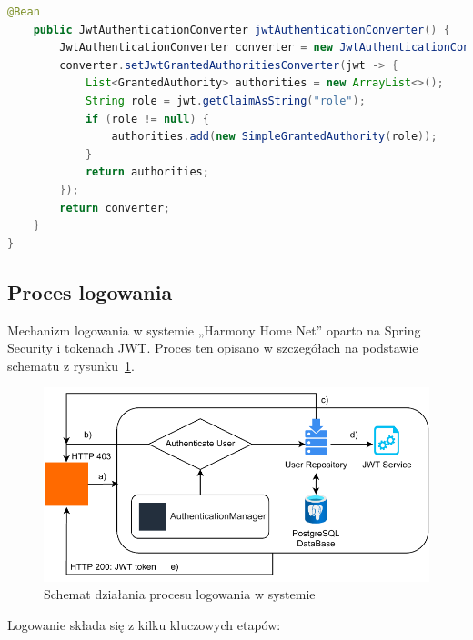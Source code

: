 \begin{lstlisting}[language=Java, style=JavaStyle, caption=Pełna konfiguracja łańcucha filtrów bezpieczeństwa]
    @Bean
    public JwtAuthenticationConverter jwtAuthenticationConverter() {
        JwtAuthenticationConverter converter = new JwtAuthenticationConverter();
        converter.setJwtGrantedAuthoritiesConverter(jwt -> {
            List<GrantedAuthority> authorities = new ArrayList<>();
            String role = jwt.getClaimAsString("role");
            if (role != null) {
                authorities.add(new SimpleGrantedAuthority(role));
            }
            return authorities;
        });
        return converter;
    }
}
\end{lstlisting}

\subsection{Proces logowania}

Mechanizm logowania w systemie „Harmony Home Net” oparto na Spring Security i tokenach JWT. Proces ten opisano w szczegółach na podstawie schematu z rysunku~\ref{fig:login_process}.

\begin{figure}[ht]
    \centering
    \includegraphics[scale=1.0]{rys03/proces_logowania}
    \caption{Schemat działania procesu logowania w systemie~\cite{JWToauth}}
    \label{fig:login_process}
\end{figure}

Logowanie składa się z kilku kluczowych etapów:

